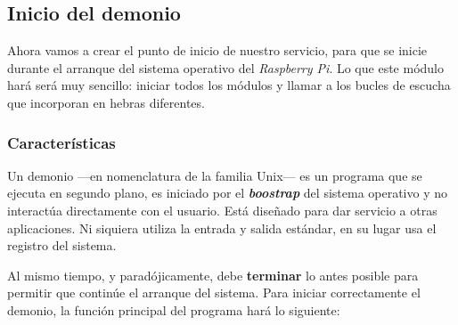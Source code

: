 \subsection{Inicio del demonio}

Ahora vamos a crear el punto de inicio de nuestro servicio, para que se inicie durante el arranque del sistema operativo del \textit{Raspberry Pi}. Lo que este módulo hará será muy sencillo: iniciar todos los módulos y llamar a los bucles de escucha que incorporan en hebras diferentes.

\subsubsection{Características}

Un demonio ---en nomenclatura de la familia Unix--- es un programa que se ejecuta en segundo plano, es iniciado por el \textbf{\textit{boostrap}} del sistema operativo y no interactúa directamente con el usuario. Está diseñado para dar servicio a otras aplicaciones. Ni siquiera utiliza la entrada y salida estándar, en su lugar usa el registro del sistema.

Al mismo tiempo, y paradójicamente, debe \textbf{terminar} lo antes posible para permitir que continúe el arranque del sistema. Para iniciar correctamente el demonio, la función principal del programa hará lo siguiente: \cite{shahmir_daemon}

